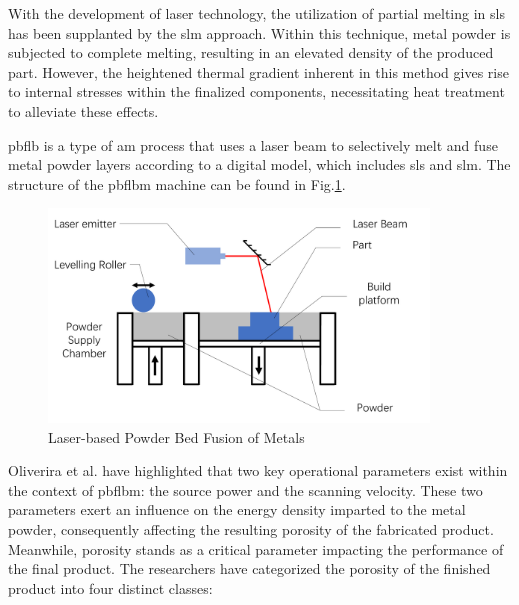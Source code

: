 With the development of laser technology, the utilization of partial 
melting in \gls{sls} has been supplanted by the \gls{slm} approach. 
Within this technique, metal powder is subjected to complete melting, 
resulting in an elevated density of the produced part. However, 
the heightened thermal gradient inherent in this method gives rise to 
internal stresses within the finalized components\cite{Hooper.2018}, necessitating
heat treatment to alleviate these effects\cite{Osakada.2006}.


\gls{pbflb} is a type of \gls{am} process that uses a 
laser beam to selectively melt and fuse metal powder layers according 
to a digital model\cite{Swift.2013}, which includes \gls{sls} and \gls{slm}.
The structure of the \gls{pbflbm} machine can be found in Fig.\ref{fig: pbflbm}.

\begin{figure}[htbp]
    \centering
    \includegraphics[width=0.9\textwidth]{figures/pbflbm.pdf}
    \caption{Laser-based Powder Bed Fusion of Metals}
    \label{fig: pbflbm}
\end{figure}


Oliverira et al. \cite{Oliveira.2020} have highlighted that two key operational parameters 
exist within the context of \gls{pbflbm}: the source power and the 
scanning velocity. These two parameters exert an influence on the energy 
density imparted to the metal powder, consequently affecting the resulting 
porosity of the fabricated product. Meanwhile, porosity stands as a 
critical parameter impacting the performance of the final product. 
The researchers \cite{Oliveira.2020} have categorized the porosity of the 
finished product into four distinct classes:

